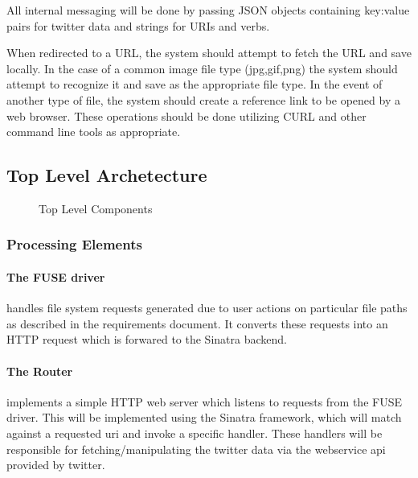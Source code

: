 All internal messaging will be done by passing JSON objects containing key:value
pairs for twitter data and strings for URIs and verbs.

When redirected to a URL, the system should attempt to fetch the URL and save
locally. In the case of a common image file type (jpg,gif,png) the system should
attempt to recognize it and save as the appropriate file type. In the event of
another type of file, the system should create a reference link to be opened by
a web browser. These operations should be done utilizing CURL and other command
line tools as appropriate.  

\subsection{Top Level Archetecture}

\begin{figure}[h]
\centering
{}
\caption{Top Level Components}\label{fig:top-top}
\end{figure}

\subsubsection{Processing Elements}

\paragraph{The FUSE driver} handles file system requests generated due
to user actions on particular file paths as described in the requirements
document. It converts these requests into an HTTP request which is forwared to
the Sinatra backend.

\paragraph{The Router} implements a simple HTTP web server which listens to requests from
the FUSE driver. This will be implemented using the Sinatra framework, which
will match against a requested uri and invoke a specific handler. These handlers
will be responsible for fetching/manipulating the twitter data via the
webservice api provided by twitter.

